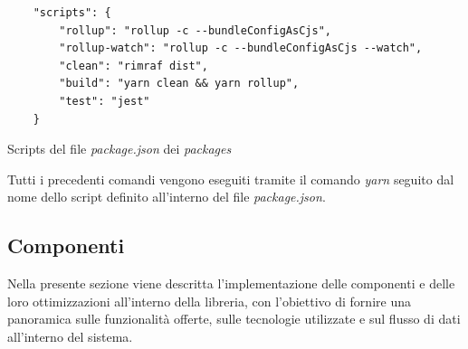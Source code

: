 \begin{listing}[H]
    \begin{verbatim}
    "scripts": {
        "rollup": "rollup -c --bundleConfigAsCjs",
        "rollup-watch": "rollup -c --bundleConfigAsCjs --watch",
        "clean": "rimraf dist",
        "build": "yarn clean && yarn rollup",
        "test": "jest"
    }
    \end{verbatim}
    \caption{Scripts del file \textit{package.json} dei \textit{packages}}
    \label{listing:scripts_package_json_packages}
\end{listing}
Tutti i precedenti comandi vengono eseguiti tramite il comando \textit{yarn} seguito dal nome dello script definito all'interno del file \textit{package.json}.

\subsection{Componenti}
Nella presente sezione viene descritta l'implementazione delle componenti e delle loro ottimizzazioni all'interno della libreria,
con l'obiettivo di fornire una panoramica sulle funzionalità offerte, sulle tecnologie utilizzate e sul flusso di dati all'interno del sistema.

